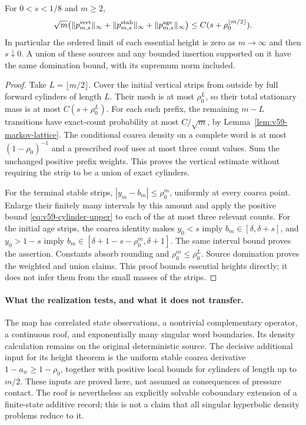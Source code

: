 \begin{theorem}
\label{thm:v59-markov-boundary-height}
For $0<s<1/8$ and $m\ge2$,
\begin{equation}\label{eq:v59-markov-boundary-height}
 \sqrt m\bigl(\|p_{m,s}^{\rm vert}\|_\infty
       +\|p_{m,s}^{\rm stab}\|_\infty
       +\|p_{m,s}^{\rm age}\|_\infty\bigr)
                            \le C(s+\rho_0^{\lfloor m/2\rfloor}).
\end{equation}
In particular the ordered limit of each essential height is zero as
$m\to\infty$ and then $s\downarrow0$. A union of these sources and
any bounded insertion supported on it have the same domination bound,
with its supremum norm included.
\end{theorem}
\begin{proof}
Take $L=\lfloor m/2\rfloor$. Cover the initial vertical strips from
outside by full forward cylinders of length $L$. Their mesh is at most
$\rho_0^L$, so their total stationary mass is at most $C(s+\rho_0^L)$.
For each such prefix, the remaining $m-L$ transitions have exact-count
probability at most $C/\sqrt m$, by
Lemma~\ref{lem:v59-markov-lattice}. The conditional coarea density on a
complete word is at most $(1-\rho_0)^{-1}$ and a prescribed roof uses
at most three count values. Sum the unchanged positive prefix weights.
This proves the vertical estimate without requiring the strip to be a
union of exact cylinders.

For the terminal stable strips, $|y_m-b_m|\le\rho_0^m$, uniformly
at every coarea point. Enlarge their finitely many intervals by this
amount and apply the positive bound \eqref{eq:v59-cylinder-upper} to
each of the at most three relevant counts. For the initial age strips,
the coarea identity makes $y_0<s$ imply
$b_m\in[\delta,\delta+s]$, and $y_0>1-s$ imply
$b_m\in[\delta+1-s-\rho_0^m,\delta+1]$.
The same interval bound proves the assertion. Constants absorb rounding
and $\rho_0^m\le\rho_0^L$. Source domination proves the weighted and
union claims. This proof bounds essential heights directly; it does not
infer them from the small masses of the strips.
\end{proof}

\paragraph{What the realization tests, and what it does not transfer.}
The map has correlated state observations, a nontrivial complementary
operator, a continuous roof, and exponentially many singular word
boundaries. Its density calculation remains on the original deterministic
source. The decisive additional input for its height theorem is the
uniform stable coarea derivative $1-a_w\ge1-\rho_0$, together with
positive local bounds for cylinders of length up to $m/2$.
These inputs are proved here, not assumed as consequences of pressure
contact. The roof is nevertheless an explicitly solvable coboundary
extension of a finite-state additive record; this is not a claim that
all singular hyperbolic density problems reduce to it.

